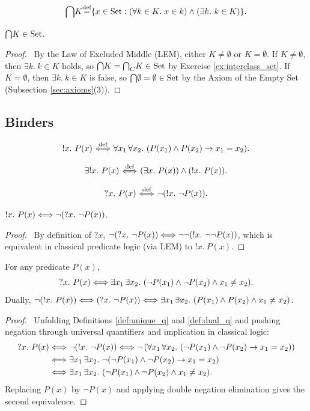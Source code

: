 \documentclass[10pt,a4paper]{article}
\renewcommand{\myprf}{\begin{proof}}
\renewcommand{\myqed}{\end{proof}}
\begin{document}
\begin{definition}
$${\bigcap} K {\stackrel{{\textrm{def}}}{=}} \{x \in {\textrm{Set}} : (\forall k\in K.\ x\in k)\land (\exists k.\ k\in K)\}.$$
\end{definition}

\begin{exercise}
${\bigcap} K \in {\textrm{Set}}$.
\end{exercise}
\myprf\ By the Law of Excluded Middle (LEM), either $K \neq \emptyset$ or $K = \emptyset$. If $K \neq \emptyset$, then $\exists k.\ k \in K$ holds, so ${\bigcap} K = {{\bigcap}_C} K \in {\textrm{Set}}$ by Exercise \ref{ex:interclass_set}. If $K = \emptyset$, then $\exists k.\ k \in K$ is false, so ${\bigcap} \emptyset = \emptyset \in {\textrm{Set}}$ by the Axiom of the Empty Set (Subsection \ref{sec:axioms}(3)). \myqed

\subsection{Binders}\label{sec:binders}
\begin{definition}\label{def:unique_q}
$$!x.\ P(x) \propdef \forall x_1\, \forall x_2.\ (P(x_1)\land P(x_2)\to x_1=x_2).$$
\end{definition}

\begin{definition}
$$\exists !x.\ P(x) \propdef (\exists x.\ P(x))\land(!x.\ P(x)).$$
\end{definition}

\begin{definition}\label{def:dual_q}
$$?x.\ P(x) {\stackrel{{\textrm{def}}}{\ \Longleftrightarrow\ }} \neg (!x.\ \neg P(x)).$$
\end{definition}

\begin{exercise}
$!x.\ P(x) \Longleftrightarrow \neg (?x.\ \neg P(x))$.
\end{exercise}
\myprf\ By definition of $?x$, $\neg (?x.\ \neg P(x)) \LRA \neg \neg (!x.\ \neg \neg P(x))$, which is equivalent in classical predicate logic (via LEM) to $!x.\ P(x)$. \myqed

\begin{lemma}
For any predicate $P(x)$,
$$?x.\ P(x) \LRA \exists x_1\, \exists x_2.\ (\neg P(x_1) \land \neg P(x_2) \land x_1 \neq x_2).$$
Dually, $\neg (!x.\ P(x)) \Longleftrightarrow (?x.\ \neg P(x)) \Longleftrightarrow \exists x_1\, \exists x_2.\ (P(x_1) \land P(x_2) \land x_1 \neq x_2)$.
\end{lemma}
\myprf\ Unfolding Definitions \ref{def:unique_q} and \ref{def:dual_q} and pushing negation through universal quantifiers and implication in classical logic:
\begin{align*}
?x.\ P(x) &\Longleftrightarrow \neg (!x.\ \neg P(x)) \Longleftrightarrow \neg \left(\forall x_1\, \forall x_2.\ (\neg P(x_1) \land \neg P(x_2) \to x_1 = x_2)\right) \\
&\Longleftrightarrow \exists x_1\, \exists x_2.\ \neg (\neg P(x_1) \land \neg P(x_2) \to x_1 = x_2) \\
&\Longleftrightarrow \exists x_1\, \exists x_2.\ (\neg P(x_1) \land \neg P(x_2) \land x_1 \neq x_2).
\end{align*}
Replacing $P(x)$ by $\neg P(x)$ and applying double negation elimination gives the second equivalence. \myqed
\end{document}
